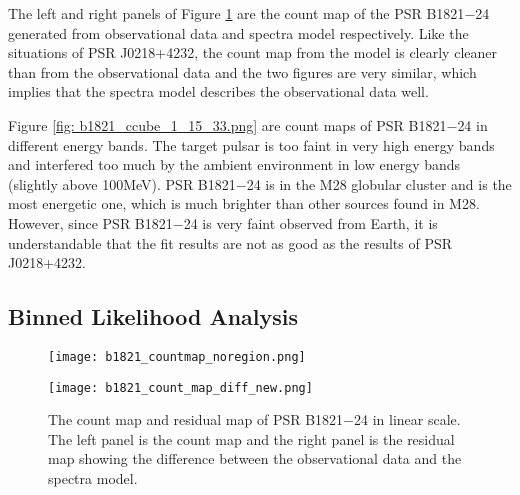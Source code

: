 \documentclass[a4paper, 12pt]{report}
\begin{document}
      The left and right panels of Figure \ref{fig: b1821_count_map_diff.png} are the count 
      map of the PSR B1821$-$24 generated from observational data and spectra model respectively. 
      Like the situations of PSR J0218+4232, the count map from the model is clearly cleaner than 
      from the observational data and the two figures are very similar, which implies that 
      the spectra model describes the observational data well.  

      Figure \ref{fig: b1821_ccube_1_15_33.png} are count maps of PSR B1821$-$24 in 
      different energy bands. The target pulsar is too faint in very high energy bands 
      and interfered too much by the ambient environment in low energy bands 
      (slightly above 100MeV). PSR B1821$-$24 is in the M28 globular cluster and is the most 
      energetic one, which is much brighter than other sources found in M28. However, since 
      PSR B1821$-$24 is very faint observed from Earth, it is understandable that the fit 
      results are not as good as the results of PSR J0218+4232. 
    \subsection{Binned Likelihood Analysis}
      \begin{figure}[!ht]
        \begin{center}
        \begin{minipage}{0.45\textwidth}
          \begin{center} 
            \texttt{[image: b1821\_countmap\_noregion.png]}
          \end{center}
        \end{minipage}
        \begin{minipage}{0.45\textwidth}
          \begin{center}
            \texttt{[image: b1821\_count\_map\_diff\_new.png]}
          \end{center}
        \end{minipage}
      \end{center}
      \caption[The count map and residual map of PSR B1821$-$24 in linear scale.]
        {The count map and residual map of PSR B1821$-$24 in linear scale. 
        The left panel is the count map and the right panel is the residual map showing the 
        difference between the observational data and the spectra model.}
        \label{fig: b1821_count_map_diff.png}
      \end{figure}
\end{document}
